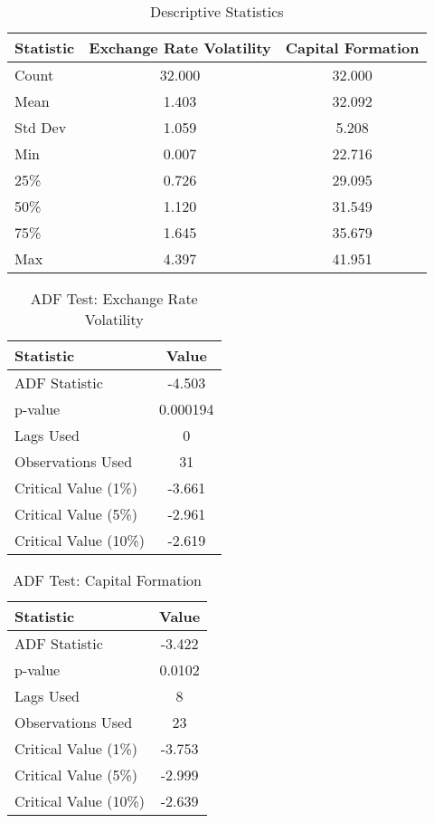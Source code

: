 \documentclass{article} %
\begin{document}
\begin{table}[h]
    \centering
    \caption{Descriptive Statistics}
    \begin{tabular}{lcc}
        \toprule
        Statistic & Exchange Rate Volatility & Capital Formation \\
        \midrule
        Count & 32.000 & 32.000 \\
        Mean & 1.403 & 32.092 \\
        Std Dev & 1.059 & 5.208 \\
        Min & 0.007 & 22.716 \\
        25\% & 0.726 & 29.095 \\
        50\% & 1.120 & 31.549 \\
        75\% & 1.645 & 35.679 \\
        Max & 4.397 & 41.951 \\
        \bottomrule
    \end{tabular}
\end{table}
\begin{table}[h]
    \centering
    \caption{ADF Test: Exchange Rate Volatility}
    \begin{tabular}{lc}
        \toprule
        Statistic & Value \\
        \midrule
        ADF Statistic & -4.503 \\
        p-value & 0.000194 \\
        Lags Used & 0 \\
        Observations Used & 31 \\
        Critical Value (1\%) & -3.661 \\
        Critical Value (5\%) & -2.961 \\
        Critical Value (10\%) & -2.619 \\
        \bottomrule
    \end{tabular}
\end{table}

\begin{table}[h]
    \centering
    \caption{ADF Test: Capital Formation}
    \begin{tabular}{lc}
        \toprule
        Statistic & Value \\
        \midrule
        ADF Statistic & -3.422 \\
        p-value & 0.0102 \\
        Lags Used & 8 \\
        Observations Used & 23 \\
        Critical Value (1\%) & -3.753 \\
        Critical Value (5\%) & -2.999 \\
        Critical Value (10\%) & -2.639 \\
        \bottomrule
    \end{tabular}
\end{table}
\end{document}
